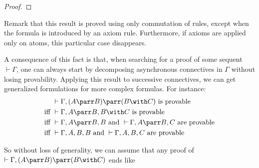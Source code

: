 \begin{proof}

\end{proof}

Remark that this result is proved using only commutation of rules, except
when the formula is introduced by an axiom rule. Furthermore, if axioms
are applied only on atoms, this particular case disappears.

A consequence of this fact is that, when searching for a proof of some
sequent \(\vdash\Gamma\), one can always start by decomposing asynchronous
connectives in \(\Gamma\) without losing provability. Applying this
result to successive connectives, we can get generalized formulations
for more complex formulas. For instance:
\begin{align*}
&\vdash\Gamma,(A\parr B)\parr(B\with C) \text{ is provable} \\
\text{iff } &\vdash\Gamma,A\parr B,B\with C \text{ is provable} \\
\text{iff } &\vdash\Gamma,A\parr B,B\text{ and }\vdash\Gamma,A\parr B,C \text{ are
  provable} \\
\text{iff } &\vdash\Gamma,A,B,B\text{ and }\vdash\Gamma,A,B,C \text{ are provable}
\end{align*}

So without loss of generality, we can assume that any proof of
\(\vdash\Gamma,(A\parr B)\parr(B\with C)\) ends like
\begin{prooftree}
\end{prooftree}

